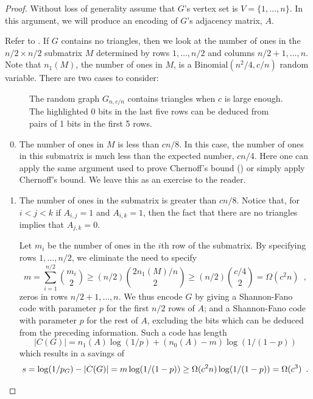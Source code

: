 \documentclass{patmorin}
\begin{document}
\begin{proof}
  Without loss of generality assume that $G$'s vertex set is
  $V=\{1,\ldots,n\}$.  In this argument, we will produce an encoding
  of $G$'s adjacency matrix, $A$.

  Refer to .  If $G$ contains no triangles, then we
  look at the number of ones in the $n/2\times n/2$ submatrix $M$
  determined by rows $1,\ldots,n/2$ and columns $n/2+1,\ldots,n$. Note
  that $n_1(M)$, the number of ones in $M$, is a
  $\mathrm{Binomial}(n^2/4, c/n)$ random variable.  There are two
  cases to consider:
  
  \begin{figure}
    \caption{The random graph $G_{n,c/n}$ contains triangles when $c$
      is large enough.  The highlighted 0 bits in the last five rows
      can be deduced from pairs of 1 bits in the first 5 rows.}
  \end{figure}

  \begin{enumerate}\setcounter{enumi}{-1}
  \item The number of ones in $M$ is less than $cn/8$.  In this case,
    the number of ones in this submatrix is much less than the
    expected number, $cn/4$.  Here one can apply the same argument
    used to prove Chernoff's bound () or simply apply
    Chernoff's bound. We leave this as an exercise to the reader.

  \item The number of ones in the submatrix is greater than $cn/8$.
    Notice that, for $i<j<k$ if $A_{i,j}=1$ and $A_{i,k}=1$, then the
    fact that there are no triangles implies that $A_{j,k}=0$.

    Let $m_i$ be the number of ones in the $i$th row of the submatrix.
    By specifying rows $1,\ldots,n/2$, we eliminate the need to
    specify
    \[
      m = \sum_{i=1}^{n/2}\binom{m_i}{2} \ge (n/2) \binom{2
        n_1(M)/n}{2} \ge (n/2)\binom{c/4}{2} = \Omega(c^2n) \enspace ,
    \]
    zeros in rows $n/2+1,\ldots,n$. We thus encode $G$ by giving a
    Shannon-Fano code with parameter $p$ for the first $n/2$ rows of
    $A$; and a Shannon-Fano code with parameter $p$ for the rest of
    $A$, excluding the bits which can be deduced from the preceding
    information. Such a code has length
    \[
      |C(G)| = n_1(A) \log(1/p) + (n_0(A)-m)\log(1/(1-p))
    \]
    which results in a savings of
    \[
      s = \log(1/p_G) - |C(G)| = m\log(1/(1-p)) \ge
      \Omega(c^2n)\log(1/(1-p)) = \Omega(c^3) \enspace . \qedhere
    \]
  \end{enumerate}
\end{proof}
\end{document}
